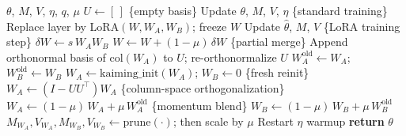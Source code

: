 \begin{algorithm}[H]
\caption{SuperReLoRa with transition momentum.
\(\theta\) denotes model parameters; \(\hat{\theta}\) the model after replacing linear layers by LoRA adapters; \(M,V\) are Adam states; \(\eta\) follows a jagged schedule; \(q\) is the merge/reinit period; \(\mu\) is the transition momentum; \(U\) stores an orthonormal basis of past adapter column spaces.}
\label{alg:superrelora}
\begin{algorithmic}[1]
\Require \(\theta\), \(M\), \(V\), \(\eta\), \(q\), \(\mu\)
\State \(U \leftarrow [\,]\) \{empty basis\}
    \State Update \(\theta\), \(M\), \(V\), \(\eta\) \{standard training\}
\EndFor
{}
        \State Replace layer by LoRA\((W, W_A, W_B)\); freeze \(W\)
    \EndIf
\EndFor
{}
    \State Update \(\hat{\theta}\), \(M\), \(V\) \{LoRA training step\}
            \State \(\delta W \leftarrow s\, W_A W_B\)
            \State \(W \leftarrow W + (1-\mu)\, \delta W\) \{partial merge\}
            \State Append orthonormal basis of \(\mathrm{col}(W_A)\) to \(U\); re-orthonormalize \(U\)
            \State \(W_A^{\mathrm{old}} \leftarrow W_A\); \(W_B^{\mathrm{old}} \leftarrow W_B\)
            \State \(W_A \leftarrow \mathrm{kaiming\_init}(W_A)\); \(W_B \leftarrow 0\) \{fresh reinit\}
            \State \(W_A \leftarrow (I - U U^\top) W_A\) \{column-space orthogonalization\}
            \State \(W_A \leftarrow (1-\mu)\, W_A + \mu\, W_A^{\mathrm{old}}\) \{momentum blend\}
            \State \(W_B \leftarrow (1-\mu)\, W_B + \mu\, W_B^{\mathrm{old}}\)
            \State \(M_{W_A},V_{W_A},M_{W_B},V_{W_B} \leftarrow \mathrm{prune}(\cdot)\); then scale by \(\mu\)
        \EndFor
        \State Restart \(\eta\) warmup
    \EndIf
\EndFor
\State \textbf{return} \(\theta\)
\end{algorithmic}
\end{algorithm}
